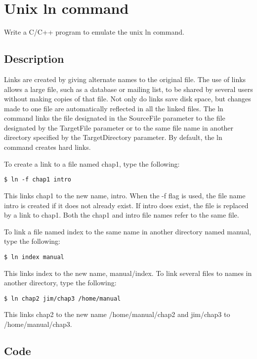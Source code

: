 \chapter{Unix ln command}

Write a C/C++ program to emulate the unix ln command.

\section{Description}

Links are created by giving alternate names to the original file. The use of links allows a large file, such as a database or mailing list, to be shared by several users without making copies of that file. Not only do links save disk space, but changes made to one file are automatically reflected in all the linked files. The ln command links the file designated in the SourceFile parameter to the file designated by the TargetFile parameter or to the same file name in another directory specified by the TargetDirectory parameter. By default, the ln command creates hard links.


To create a link to a file named chap1, type the following:
\begin{lstlisting}[style=shell-command]
	$ ln -f chap1 intro
\end{lstlisting}

This links chap1 to the new name, intro. When the -f flag is used, the file name intro is created if it does not already exist. If intro does exist, the file is replaced by a link to chap1. Both the chap1 and intro file names refer to the same file.

To link a file named index to the same name in another directory named manual, type the following:
\begin{lstlisting}[style=shell-command]
	$ ln index manual
\end{lstlisting}

This links index to the new name, manual/index. To link several files to names in another directory, type the following:
\begin{lstlisting}[style=shell-command]
	$ ln chap2 jim/chap3 /home/manual
\end{lstlisting}

This links chap2 to the new name /home/manual/chap2 and jim/chap3 to /home/manual/chap3.

\section{Code}

